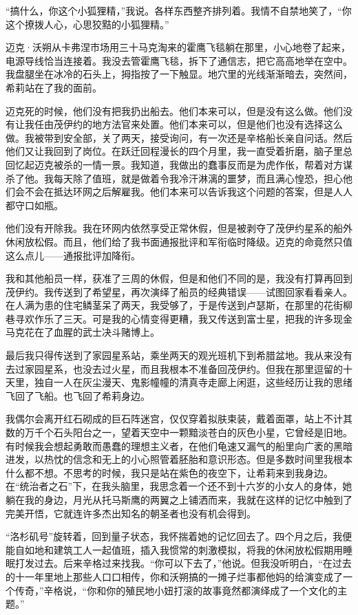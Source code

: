 \documentclass[AutoFakeBold=true]{book}
\begin{document}
``搞什么，你这个小狐狸精，''我说。各样东西整齐排列着。我情不自禁地笑了，``你这个撩拨人心，心思狡黠的小狐狸精。''

迈克·沃朔从卡弗涅市场用三十马克淘来的霍鹰飞毯躺在那里，小心地卷了起来，电源导线恰当连接着。我没去管霍鹰飞毯，拆下了通信志，把它高高地举在空中。我盘腿坐在冰冷的石头上，拇指按了一下触显。地穴里的光线渐渐暗去，突然间，希莉站在了我的面前。

\vspace*{1em}

迈克死的时候，他们没有把我扔出船去。他们本来可以，但是没有这么做。他们没有让我任由茂伊约的地方法官来处置。他们本来可以，但是他们也没有选择这么做。我被带到安全部，关了两天，接受询问，有一次还是辛格船长亲自问话。然后他们又让我回到了岗位。在跃迁回程漫长的四个月里，我一直受着折磨，脑子里总回忆起迈克被杀的一情一景。我知道，我做出的蠢事反而是为虎作伥，帮着对方谋杀了他。我每天除了值班，就是做着令我冷汗淋漓的噩梦，而且满心惶恐，担心他们会不会在抵达环网之后解雇我。他们本来可以告诉我这个问题的答案，但是人人都守口如瓶。

他们没有开除我。我在环网内依然享受正常休假，但是被剥夺了茂伊约星系的船外休闲放松假。而且，他们给了我书面通报批评和军衔临时降级。迈克的命竟然只值这么点儿——通报批评加降衔。

我和其他船员一样，获准了三周的休假，但是和他们不同的是，我没有打算再回到茂伊约。我传送到了希望星，再次演绎了船员的经典错误——试图回家看看亲人。在人满为患的住宅鳞茎呆了两天，我受够了，于是传送到卢瑟斯，在那里的花街柳巷寻欢作乐了三天。可是我的心情变得更糟，我又传送到富士星，把我的许多现金马克花在了血腥的武士决斗赌博上。

最后我只得传送到了家园星系站，乘坐两天的观光班机下到希腊盆地。我从来没有去过家园星系，也没去过火星，而且我根本不准备回茂伊约。但我在那里逗留的十天里，独自一人在灰尘漫天、鬼影幢幢的清真寺走廊上闲逛，这些经历让我的思绪飞回了飞船。也飞回了希莉身边。

我偶尔会离开红石砌成的巨石阵迷宫，仅仅穿着拟肤束装，戴着面罩，站上不计其数的万千个石头阳台之一，望着天空中一颗黯淡苍白的灰色小星，它曾经是旧地。有时候我会想起勇敢而愚蠢的理想主义者，在他们龟速又漏气的船里向广袤的黑暗进发，以热忱的信念和无上的小心照管着胚胎和意识形态。但是多数时间里我根本什么都不想。不思考的时候，我只是站在紫色的夜空下，让希莉来到我身边。在``统治者之石''下，在我头脑里，我思念着一个还不到十六岁的小女人的身体，她躺在我的身边，月光从托马斯鹰的两翼之上铺洒而来，我就在这样的记忆中触到了完美开悟，它就连许多杰出知名的朝圣者也没有机会得到。

``洛杉矶号''旋转着，回到量子状态，我怀揣着她的记忆回去了。四个月之后，我便能自如地和建筑工人一起值班，插入我惯常的刺激模拟，将我的休闲放松假期用睡眠打发过去。后来辛格过来找我。``你可以下去了，''他说。但我没听明白，``在过去的十一年里地上那些人口口相传，你和沃朔搞的一摊子烂事都他妈的给演变成了一个传奇，''辛格说，``你和你的殖民地小妞打滚的故事竟然都演绎成了一个文化的主题。''
\end{document}
